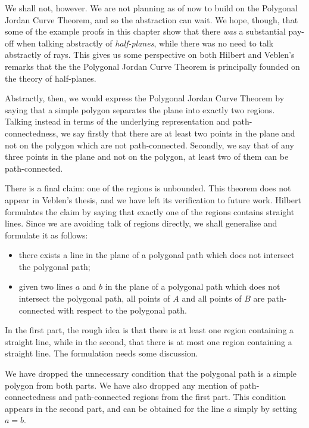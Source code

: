 We shall not, however. We are not planning as of now to build on the Polygonal Jordan Curve Theorem, and so the abstraction can wait. We hope, though, that some of the example proofs in this chapter show that there \emph{was} a substantial pay-off when talking abstractly of \emph{half-planes}, while there was no need to talk abstractly of rays. This gives us some perspective on both Hilbert and Veblen's remarks that the the Polygonal Jordan Curve Theorem is principally founded on the theory of half-planes.

Abstractly, then, we would express the Polygonal Jordan Curve Theorem by saying that a simple polygon separates the plane into exactly two regions. Talking instead in terms of the underlying representation and path-connectedness, we say firstly that there are at least two points in the plane and not on the polygon which are not path-connected. Secondly, we say that of any three points in the plane and not on the polygon, at least two of them can be path-connected.

There is a final claim: one of the regions is unbounded. This theorem does not appear in Veblen's thesis, and we have left its verification to future work. Hilbert formulates the claim by saying that exactly one of the regions contains straight lines. Since we are avoiding talk of regions directly, we shall generalise and formulate it as follows:
\begin{itemize}
\item there exists a line in the plane of a polygonal path which does not intersect the polygonal path;
\item given two lines $a$ and $b$ in the plane of a polygonal path which does not intersect the polygonal path, all points of $A$ and all points of $B$ are path-connected with respect to the polygonal path.
\end{itemize}

In the first part, the rough idea is that there is at least one region containing a straight line, while in the second, that there is at most one region containing a straight line. The formulation needs some discussion. 

We have dropped the unnecessary condition that the polygonal path is a simple polygon from both parts. We have also dropped any mention of path-connectedness and path-connected regions from the first part. This condition appears in the second part, and can be obtained for the line $a$ simply by setting $a=b$.

